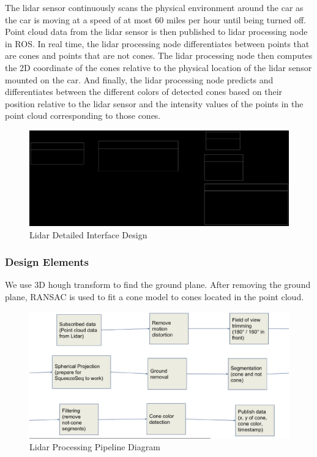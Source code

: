 \documentclass[10pt, onecolumn, draftclsnofoot, letterpaper,compsoc]{IEEEtran}
\begin{document}
The lidar sensor continuously scans the physical environment around the car as the car is moving at a speed of at most 60 miles per hour until being turned off. Point cloud data from the lidar sensor is then published to lidar processing node in ROS. In real time, the lidar processing node differentiates between points that are cones and points that are not cones. The lidar processing node then computes the 2D coordinate of the cones relative to the physical location of the lidar sensor mounted on the car. And finally, the lidar processing node predicts and differentiates between the different colors of detected cones based on their position relative to the lidar sensor and the intensity values of the points in the point cloud corresponding to those cones.

\begin{figure}[htbp]
\centering
\label{fig:LidarInterfaceOverview}
\caption{Lidar Detailed Interface Design}
\includegraphics[width=18cm]{images/LidarInterfaceDetails}
\end{figure}

\subsubsection{Design Elements} %
We use 3D hough transform to find the ground plane. After removing the ground plane, RANSAC is used to fit a cone model to cones located in the point cloud.

\begin{figure}[htbp]
\centering
\label{fig:LidarPipeline}
\caption{Lidar Processing Pipeline Diagram}
\includegraphics[width=15cm]{images/LidarPipeline}
\end{figure}
\end{document}

